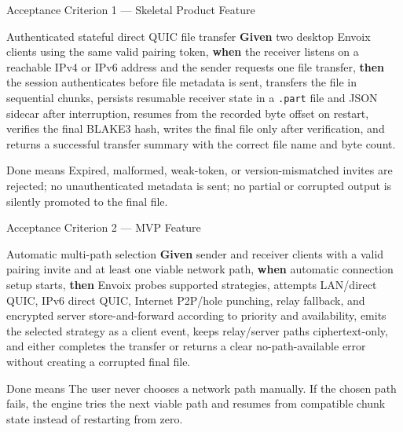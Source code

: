 \documentclass[xcolor=table,dvipsnames,svgnames,aspectratio=169]{beamer}
\begin{document}
\begin{frame}[shrink=7]{Acceptance Criterion 1 --- Skeletal Product Feature}
\begin{block}{Authenticated stateful direct QUIC file transfer}
\small
\textbf{Given} two desktop Envoix clients using the same valid pairing token,
\textbf{when} the receiver listens on a reachable IPv4 or IPv6 address and the
sender requests one file transfer, \textbf{then} the session authenticates before
file metadata is sent, transfers the file in sequential chunks, persists
resumable receiver state in a \texttt{.part} file and JSON sidecar after
interruption, resumes from the recorded byte offset on restart, verifies the
final BLAKE3 hash, writes the final file only after verification, and returns a
successful transfer summary with the correct file name and byte count.
\end{block}

\begin{alertblock}{Done means}
\small
Expired, malformed, weak-token, or version-mismatched invites are rejected; no
unauthenticated metadata is sent; no partial or corrupted output is silently
promoted to the final file.
\end{alertblock}
\end{frame}

\begin{frame}[shrink=7]{Acceptance Criterion 2 --- MVP Feature}
\begin{block}{Automatic multi-path selection}
\small
\textbf{Given} sender and receiver clients with a valid pairing invite and at
least one viable network path, \textbf{when} automatic connection setup starts,
\textbf{then} Envoix probes supported strategies, attempts LAN/direct QUIC,
IPv6 direct QUIC, Internet P2P/hole punching, relay fallback, and encrypted
server store-and-forward according to priority and availability, emits the
selected strategy as a client event, keeps relay/server paths ciphertext-only,
and either completes the transfer or returns a clear no-path-available error
without creating a corrupted final file.
\end{block}

\begin{alertblock}{Done means}
\small
The user never chooses a network path manually. If the chosen path fails, the
engine tries the next viable path and resumes from compatible chunk state
instead of restarting from zero.
\end{alertblock}
\end{frame}
\end{document}

